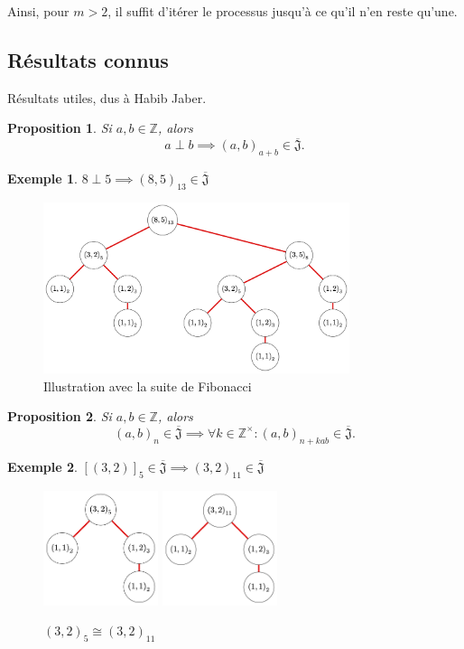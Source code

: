 \documentclass{article}
\newtheorem{proposition}{Proposition}
\newtheorem{example}{Exemple}
\newcommand{\J}{\mathfrak{J}}
\newcommand{\JS}{\overline{\J}}
\begin{document}
Ainsi, pour $m > 2$, il suffit d'itérer le processus jusqu'à ce qu'il n'en reste qu'une.

\newpage

\subsection{Résultats connus}
Résultats utiles, dus à Habib Jaber\cite{jaber2022stage}.

\begin{proposition}
    Si $a, b \in \mathbb{Z}$, alors
    \[ a \perp b \implies {(a, b)}_{a + b} \in \JS. \]
\end{proposition}

\begin{example}
    $8 \perp 5 \implies {(8, 5)}_{13} \in \JS$
\end{example}
\begin{figure}[h]
    \caption{Illustration avec la suite de Fibonacci}
    \centering
    \includegraphics[width=0.8\textwidth]{fibo}
\end{figure}

\begin{proposition}
    Si $a, b \in \mathbb{Z}$, alors
    \[ {(a, b)}_n \in \JS \implies \forall k \in \mathbb{Z}^\times : {(a, b)}_{n+kab} \in \JS. \]
\end{proposition}

\begin{example}
    ${[(3, 2)]}_5 \in \JS \implies {(3, 2)}_{11} \in \JS$
\end{example}

\begin{figure}[h]
    \caption{${(3, 2)}_5 \cong {(3, 2)}_{11}$}
    \centering
    \includegraphics[width=0.3\textwidth]{532}
    \includegraphics[width=0.3\textwidth]{11_3_2}
\end{figure}
\end{document}
